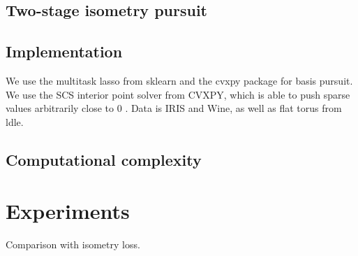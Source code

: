 \subsection{Two-stage isometry pursuit}





 

\subsection{Implementation}

We use the multitask lasso from sklearn and the cvxpy package for basis pursuit.  We use the SCS interior point solver from CVXPY, which is able to push sparse values arbitrarily close to 0 \cite{cvxpy_sparse_solution}. Data is IRIS and Wine, as well as flat torus from ldle.
\subsection{Computational complexity}
\section{Experiments}

Comparison with isometry loss.
